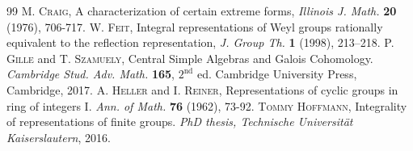 \documentclass{article}
\theoremstyle{definition}
\begin{document}
\begin{thebibliography}{99}
    \textsc{M. Craig}, A 
    characterization of certain extreme
    forms, \textit{Illinois J. Math.}
    \textbf{20} (1976), 706-717.
    \textsc{W. Feit}, Integral representations of Weyl groups rationally 
    equivalent to the reflection representation, \textit{J. Group Th.} 
    \textbf{1} (1998), 213–218.
    \textsc{ P. Gille} and \textsc{T. Szamuely}, Central Simple Algebras and 
    Galois Cohomology. \textit{Cambridge Stud. Adv. Math.} \textbf{165}, $2^{\mathrm{nd}}$ ed. Cambridge University Press, Cambridge, 2017.
    \textsc{A. Heller} and \textsc{I. Reiner}, Representations of cyclic 
    groups in ring of integers I. \textit{Ann. of Math.} 
    \textbf{76} (1962), 73-92.
    \textsc{Tommy Hoffmann}, Integrality of representations of finite 
    groups. \textit{PhD thesis, Technische Universit\"at Kaiserslautern}, 
    2016.

\end{thebibliography}
\end{document}
